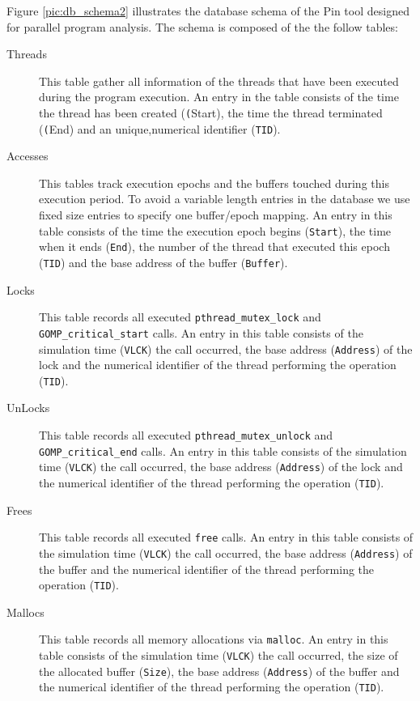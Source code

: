 Figure \ref{pic:db_schema2} illustrates the database
schema of the Pin tool designed for parallel program analysis.
The schema is composed of the the follow tables:
\begin{description}
  \item[Threads] This table gather all information of the threads that
    have been executed during the program execution. An entry in the
    table consists of the time the thread has been created
    (\texttt(Start), the time the thread terminated (\texttt(End) and
    an unique,numerical identifier (\texttt{TID}).
  \item[Accesses] This tables track execution epochs and the buffers
    touched during this execution period. To avoid a variable length
    entries in the database we use fixed size entries to specify one
    buffer/epoch mapping. An entry in this table consists of the time
    the execution epoch begins (\texttt{Start}), the time when it ends
    (\texttt{End}), the number of the thread that executed this epoch
    (\texttt{TID}) and the base address of the buffer
    (\texttt{Buffer}).
  \item[Locks] This table records all executed
    \texttt{pthread\_mutex\_lock} and
    \texttt{GOMP\_critical\_start} calls. An entry in this table
    consists of the simulation time (\texttt{VLCK}) the call occurred,
    the base address (\texttt{Address}) of the lock and the
    numerical identifier of the thread performing the operation
    (\texttt{TID}).
  \item[UnLocks] This table records all executed
    \texttt{pthread\_mutex\_unlock} and
    \texttt{GOMP\_critical\_end} calls. An entry in this table
    consists of the simulation time (\texttt{VLCK}) the call occurred,
    the base address (\texttt{Address}) of the lock and the
    numerical identifier of the thread performing the operation
    (\texttt{TID}).
  \item[Frees] This table records all executed \texttt{free} calls. An
    entry in this table consists of the simulation time
    (\texttt{VLCK}) the call occurred, the base address
    (\texttt{Address}) of the buffer and the numerical identifier of
    the thread performing the operation (\texttt{TID}).
  \item[Mallocs] This table records all memory allocations via
    \texttt{malloc}. An entry in this table consists of the simulation
    time (\texttt{VLCK}) the call occurred, the size of the allocated
    buffer (\texttt{Size}), the base address (\texttt{Address}) of
    the buffer and the numerical identifier of
    the thread performing the operation (\texttt{TID}).
\end{description}

